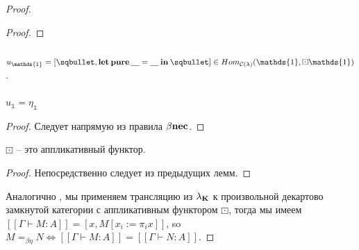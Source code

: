 \begin{proof}
\begin{proof}
\end{proof}

\begin{defin}
  $ $

  $u_{\mathds{1}} = [\sqbullet, {\bf let \: pure \:} \underline{\quad} = \underline{\quad} {\: \bf in \:} \sqbullet] \in Hom_{\mathcal{C}(\lambda)}(\mathds{1}, \boxdot \mathds{1})$.
\end{defin}

\begin{lemma}
  $ $

  $u_{\mathds{1}} = \eta_{\mathds{1}}$

\end{lemma}

\begin{proof}

  Следует напрямую из правила $\beta {\bf nec}$.
\end{proof}

\begin{lemma}

  $\boxdot$ -- это аппликативный функтор.
\end{lemma}

\begin{proof}
  Непосредственно следует из предыдущих лемм.
\end{proof}

Аналогично \cite{Abramsky}, мы применяем трансляцию из $\lambda_{{\bf K}}$ к произвольной декартово замкнутой категории с аппликативным функтором $\boxdot$, тогда
мы имеем $[\![\Gamma \vdash M : A]\!] = [x, M [x_i := \pi_i x]]$, so $M =_{\beta \eta} N \Leftrightarrow [\![\Gamma \vdash M : A]\!] = [\![\Gamma \vdash N : A]\!]$.

\end{proof}
